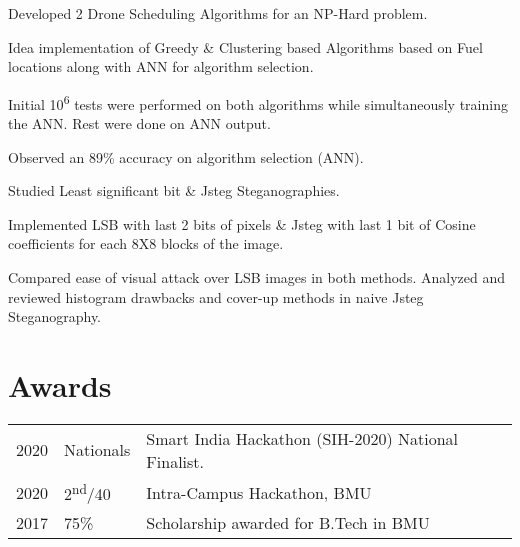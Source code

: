 \documentclass[]{deedy-resume-openfont}
\begin{document}
\begin{minipage}[t]{0.66\textwidth}
\begin{tightemize}
\item Developed 2 Drone Scheduling Algorithms for an NP-Hard problem.
\item Idea implementation of Greedy \& Clustering based Algorithms based on Fuel locations along with ANN for algorithm selection.
\item Initial 10\textsuperscript{6} tests were performed on both algorithms while simultaneously training the ANN. Rest were done on ANN output.
\item Observed an 89\% accuracy on algorithm selection (ANN).
\end{tightemize}  

\begin{tightemize}
\item Studied Least significant bit \& Jsteg Steganographies.
\item Implemented LSB with last 2 bits of pixels \& Jsteg with last 1 bit of Cosine coefficients for each 8X8 blocks of the image.
\item Compared ease of visual attack over LSB images in both methods. Analyzed and reviewed histogram drawbacks and cover-up methods in naive Jsteg Steganography.   
\end{tightemize}  


\sectionsep


\section{Awards} 
\begin{tabular}{rll}
2020	     & Nationals & Smart India Hackathon (SIH-2020) National Finalist.\\
2020	     & 2\textsuperscript{nd}/40  & Intra-Campus Hackathon, BMU \\
2017	     & 75\%  & Scholarship awarded for B.Tech in BMU \\
\end{tabular}
\sectionsep

\end{minipage} 
\end{document}
